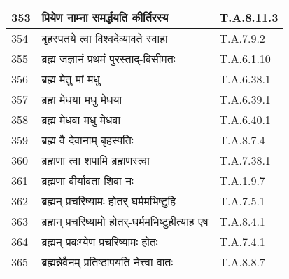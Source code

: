 \documentclass[17pt]{extarticle}
\begin{document}
\begin{longtable}{||p{0.4in}||p{4.9in}||p{0.9in}||}
    \hline
        
    353 & प्रियेण नाम्ना समर्द्धयति कीर्तिरस्य & T.A.8.11.3       \\
    
    \hline
        
    354 & बृहस्पतये त्वा विश्वदेव्यावते स्वाहा & T.A.7.9.2       \\
    
    \hline
        
    355 & ब्रह्म जज्ञानं प्रथमं पुरस्ताद्{-}विसीमतः & T.A.6.1.10       \\
    
    \hline
        
    356 & ब्रह्म मेतु मां मधु & T.A.6.38.1       \\
    
    \hline
        
    357 & ब्रह्म मेधया मधु मेधया & T.A.6.39.1       \\
    
    \hline
        
    358 & ब्रह्म मेधवा मधु मेधवा & T.A.6.40.1       \\
    
    \hline
        
    359 & ब्रह्म वै देवानाम् बृहस्पतिः & T.A.8.7.4       \\
    
    \hline
        
    360 & ब्रह्मणा त्वा शपामि ब्रह्मणस्त्वा & T.A.7.38.1       \\
    
    \hline
        
    361 & ब्रह्मणा वीर्यावता शिवा नः & T.A.1.9.7       \\
    
    \hline
        
    362 & ब्रह्मन् प्रचरिष्यामः होतर् घर्ममभिष्टुहि & T.A.7.5.1       \\
    
    \hline
        
    363 & ब्रह्मन् प्रचरिष्यामो होतर्{-}घर्ममभिष्टुहीत्याह एष & T.A.8.4.1       \\
    
    \hline
        
    364 & ब्रह्मन् प्रवःग्येण प्रचरिष्यामः होतः & T.A.7.4.1       \\
    
    \hline
        
    365 & ब्रह्मन्नेवैनम् प्रतिष्ठापयति नेत्त्वा वातः & T.A.8.8.7       \\
    

\end{longtable}
\end{document}
